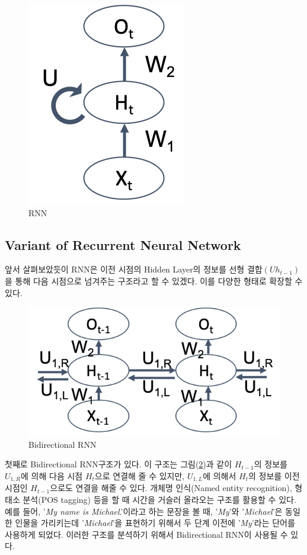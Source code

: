 \documentclass[draft=false]{oblivoir}
\begin{document}
\begin{figure}[ht] \centering 
  \includegraphics[scale=0.7]{fig7.png}
  \caption{RNN}
  \label{fig:16-7}
\end{figure}

\subsection{Variant of Recurrent Neural Network}
앞서 살펴보았듯이  RNN은 이전 시점의 Hidden Layer의 정보를 선형 결합$(Uh_{t-1})$을 통해 다음 시점으로 넘겨주는 구조라고 할 수 있겠다. 이를 다양한 형태로 확장할 수 있다. 

\begin{figure}[ht] \centering 
  \includegraphics[scale=0.7]{fig8.png}
  \caption{Bidirectional RNN}
  \label{fig:16-8}
\end{figure}

첫째로 Bidirectional RNN구조가 있다. 이 구조는 그림(\ref{fig:16-8})과 같이 $H_{t-1}$의 정보를 $U_{1,R}$에 의해 다음 시점 $H_t$으로 연결해 줄 수 있지만, $U_{1,L}$에 의해서 $H_t$의 정보를 이전 시점인  $H_{t-1}$으로도 연결을 해줄 수 있다. 개체명 인식(Named entity recognition), 형태소 분석(POS tagging) 등을 할 때 시간을 거슬러 올라오는 구조를 활용할 수 있다. 예를 들어, '\textit{My name is Michael}.'이라고 하는 문장을 볼 때,  '\textit{My}'와 '\textit{Michael}'은 동일한 인물을 가리키는데 '\textit{Michael}'을 표현하기 위해서 두 단계 이전에 '\textit{My}'라는 단어를 사용하게 되었다. 이러한 구조를 분석하기 위해서 Bidirectional RNN이 사용될 수 있다.\par
\end{document}
